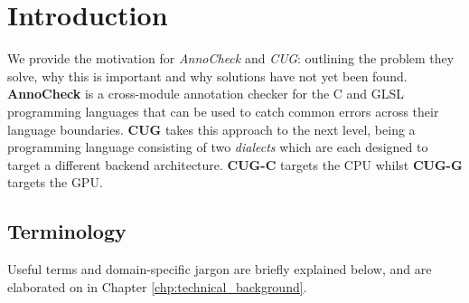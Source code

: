\documentclass[a4paper,12pt,twoside,openright]{report}
\begin{document}
\pagestyle{empty}
\singlespacing

\onehalfspacing

\singlespacing

\singlespacing


\setcounter{page}{0}
\pagestyle{plain}
\tableofcontents

\onehalfspacing


\chapter{Introduction}
\setcounter{page}{1}

We provide the motivation for \textit{AnnoCheck} and \textit{CUG}: outlining
the problem they solve, why this is important and why solutions have not yet
been found. \textbf{AnnoCheck} is a cross-module annotation checker for the C
and GLSL programming languages that can be used to catch common errors across
their language boundaries. \textbf{CUG} takes this approach to the next level,
being a programming language consisting of two \textit{dialects} which are each
designed to target a different backend architecture. \textbf{CUG-C} targets the
CPU whilst \textbf{CUG-G} targets the GPU.

\section{Terminology}

Useful terms and domain-specific jargon are briefly explained below, and are
elaborated on in Chapter \ref{chp:technical_background}.
\end{document}
